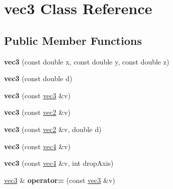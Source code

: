 \hypertarget{classvec3}{
\section{vec3 Class Reference}
\label{classvec3}
}
\subsection*{Public Member Functions}
\begin{DoxyCompactItemize}
\item 
\hypertarget{classvec3_a4cb5630fa6177147706b5158e45d0898}{
{\bfseries vec3} (const double x, const double y, const double z)}
\label{classvec3_a4cb5630fa6177147706b5158e45d0898}

\item 
\hypertarget{classvec3_aad569004a4188b5136a23898a4fa5a39}{
{\bfseries vec3} (const double d)}
\label{classvec3_aad569004a4188b5136a23898a4fa5a39}

\item 
\hypertarget{classvec3_a06ea320dd131518426173209e2e9a709}{
{\bfseries vec3} (const \hyperlink{classvec3}{vec3} \&v)}
\label{classvec3_a06ea320dd131518426173209e2e9a709}

\item 
\hypertarget{classvec3_a73e6bbf289ab4471ceed730a96717c62}{
{\bfseries vec3} (const \hyperlink{classvec2}{vec2} \&v)}
\label{classvec3_a73e6bbf289ab4471ceed730a96717c62}

\item 
\hypertarget{classvec3_a6edae09c1e20a8a7828a2e79c1541418}{
{\bfseries vec3} (const \hyperlink{classvec2}{vec2} \&v, double d)}
\label{classvec3_a6edae09c1e20a8a7828a2e79c1541418}

\item 
\hypertarget{classvec3_a050ae8cd5cff270b8e3fb4d3174dec78}{
{\bfseries vec3} (const \hyperlink{classvec4}{vec4} \&v)}
\label{classvec3_a050ae8cd5cff270b8e3fb4d3174dec78}

\item 
\hypertarget{classvec3_a61bb2f9fa43759186053f54c2c5b90cb}{
{\bfseries vec3} (const \hyperlink{classvec4}{vec4} \&v, int dropAxis)}
\label{classvec3_a61bb2f9fa43759186053f54c2c5b90cb}

\item 
\hypertarget{classvec3_a346036974a237bbe1aba74f2219486e7}{
\hyperlink{classvec3}{vec3} \& {\bfseries operator=} (const \hyperlink{classvec3}{vec3} \&v)}
\label{classvec3_a346036974a237bbe1aba74f2219486e7}


\end{DoxyCompactItemize}
